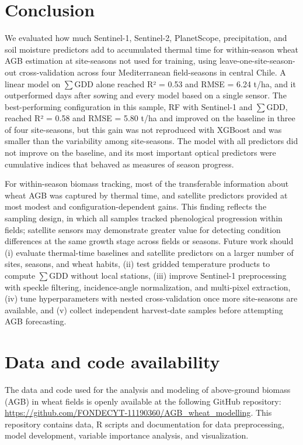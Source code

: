 \documentclass[
  english,
  review,
  number,
  sort,compress,
  authoryear,
  3p]{elsarticle}
\begin{document}
\section{Conclusion}\label{conclusion}

We evaluated how much Sentinel-1, Sentinel-2, PlanetScope,
precipitation, and soil moisture predictors add to accumulated thermal
time for within-season wheat AGB estimation at site-seasons not used for
training, using leave-one-site-season-out cross-validation across four
Mediterranean field-seasons in central Chile. A linear model on
\(\sum\)GDD alone reached R² = 0.53 and RMSE = 6.24 t/ha, and it
outperformed days after sowing and every model based on a single sensor.
The best-performing configuration in this sample, RF with Sentinel-1 and
\(\sum\)GDD, reached R² = 0.58 and RMSE = 5.80 t/ha and improved on the
baseline in three of four site-seasons, but this gain was not reproduced
with XGBoost and was smaller than the variability among site-seasons.
The model with all predictors did not improve on the baseline, and its
most important optical predictors were cumulative indices that behaved
as measures of season progress.

For within-season biomass tracking, most of the transferable information
about wheat AGB was captured by thermal time, and satellite predictors
provided at most modest and configuration-dependent gains. This finding
reflects the sampling design, in which all samples tracked phenological
progression within fields; satellite sensors may demonstrate greater
value for detecting condition differences at the same growth stage
across fields or seasons. Future work should (i) evaluate thermal-time
baselines and satellite predictors on a larger number of sites, seasons,
and wheat habits, (ii) test gridded temperature products to compute
\(\sum\)GDD without local stations, (iii) improve Sentinel-1
preprocessing with speckle filtering, incidence-angle normalization, and
multi-pixel extraction, (iv) tune hyperparameters with nested
cross-validation once more site-seasons are available, and (v) collect
independent harvest-date samples before attempting AGB forecasting.

\section*{Data and code availability}\label{data-and-code-availability}

The data and code used for the analysis and modeling of above-ground
biomass (AGB) in wheat fields is openly available at the following
GitHub repository:
\url{https://github.com/FONDECYT-11190360/AGB_wheat_modelling}. This
repository contains data, R scripts and documentation for data
preprocessing, model development, variable importance analysis, and
visualization.
\end{document}
